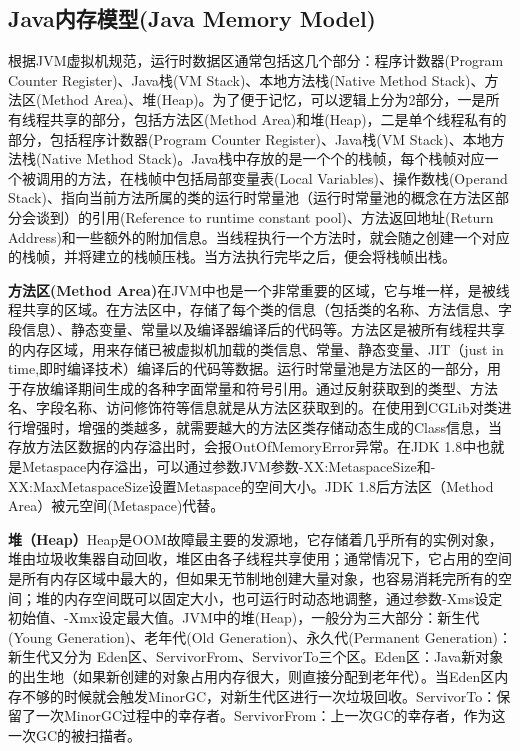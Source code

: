 \documentclass[../../../interview-questions.tex]{subfiles}
\begin{document}
\subsection{Java内存模型(Java Memory Model)}

根据JVM虚拟机规范，运行时数据区通常包括这几个部分：程序计数器(Program Counter Register)、Java栈(VM Stack)、本地方法栈(Native Method Stack)、方法区(Method Area)、堆(Heap)。为了便于记忆，可以逻辑上分为2部分，一是所有线程共享的部分，包括方法区(Method Area)和堆(Heap)，二是单个线程私有的部分，包括程序计数器(Program Counter Register)、Java栈(VM Stack)、本地方法栈(Native Method Stack)。Java栈中存放的是一个个的栈帧，每个栈帧对应一个被调用的方法，在栈帧中包括局部变量表(Local Variables)、操作数栈(Operand Stack)、指向当前方法所属的类的运行时常量池（运行时常量池的概念在方法区部分会谈到）的引用(Reference to runtime constant pool)、方法返回地址(Return Address)和一些额外的附加信息。当线程执行一个方法时，就会随之创建一个对应的栈帧，并将建立的栈帧压栈。当方法执行完毕之后，便会将栈帧出栈。

\textbf{方法区(Method Area)}在JVM中也是一个非常重要的区域，它与堆一样，是被线程共享的区域。在方法区中，存储了每个类的信息（包括类的名称、方法信息、字段信息）、静态变量、常量以及编译器编译后的代码等。方法区是被所有线程共享的内存区域，用来存储已被虚拟机加载的类信息、常量、静态变量、JIT（just in time,即时编译技术）编译后的代码等数据。运行时常量池是方法区的一部分，用于存放编译期间生成的各种字面常量和符号引用。通过反射获取到的类型、方法名、字段名称、访问修饰符等信息就是从方法区获取到的。在使用到CGLib对类进行增强时，增强的类越多，就需要越大的方法区类存储动态生成的Class信息，当存放方法区数据的内存溢出时，会报OutOfMemoryError异常。在JDK 1.8中也就是Metaspace内存溢出，可以通过参数JVM参数-XX:MetaspaceSize和-XX:MaxMetaspaceSize设置Metaspace的空间大小。JDK 1.8后方法区（Method Area）被元空间(Metaspace)代替。

\textbf{堆（Heap）}Heap是OOM故障最主要的发源地，它存储着几乎所有的实例对象，堆由垃圾收集器自动回收，堆区由各子线程共享使用；通常情况下，它占用的空间是所有内存区域中最大的，但如果无节制地创建大量对象，也容易消耗完所有的空间；堆的内存空间既可以固定大小，也可运行时动态地调整，通过参数-Xms设定初始值、-Xmx设定最大值。JVM中的堆(Heap)，一般分为三大部分：新生代(Young Generation)、老年代(Old Generation)、永久代(Permanent Generation)：新生代又分为 Eden区、ServivorFrom、ServivorTo三个区。Eden区：Java新对象的出生地（如果新创建的对象占用内存很大，则直接分配到老年代）。当Eden区内存不够的时候就会触发MinorGC，对新生代区进行一次垃圾回收。ServivorTo：保留了一次MinorGC过程中的幸存者。ServivorFrom：上一次GC的幸存者，作为这一次GC的被扫描者。
\end{document}
